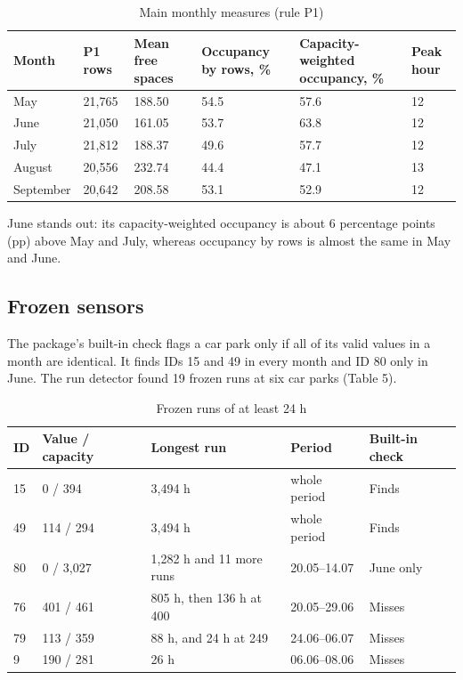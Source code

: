 \documentclass[default]{subfiles}
\begin{document}
{\begin{table}[htbp]
  \caption{Main monthly measures (rule P1)}
  \label{tab:4}
  \centering\small
  \begin{tabular}{p{}p{}p{}p{}p{}p{}}
    \hline
    \textbf{Month} & \textbf{P1 rows} & \textbf{Mean free spaces} & \textbf{Occupancy by rows, \%} & \textbf{Capacity-weighted occupancy, \%} & \textbf{Peak hour} \\ \hline
    May & 21,765 & 188.50 & 54.5 & 57.6 & 12 \\
    June & 21,050 & 161.05 & 53.7 & 63.8 & 12 \\
    July & 21,812 & 188.37 & 49.6 & 57.7 & 12 \\
    August & 20,556 & 232.74 & 44.4 & 47.1 & 13 \\
    September & 20,642 & 208.58 & 53.1 & 52.9 & 12 \\
    \hline
  \end{tabular}
\end{table}

June stands out: its capacity-weighted occupancy is about 6 percentage points (pp) above May and July, whereas occupancy by rows is almost the same in May and June.

\subsection{Frozen sensors}

The package's built-in check flags a car park only if all of its valid values in a month are identical. It finds IDs 15 and 49 in every month and ID 80 only in June. The run detector found 19 frozen runs at six car parks (Table 5).

\begin{table}[htbp]
  \caption{Frozen runs of at least 24 h}
  \label{tab:5}
  \centering\small
  \begin{tabular}{p{}p{}p{}p{}p{}}
    \hline
    \textbf{ID} & \textbf{Value / capacity} & \textbf{Longest run} & \textbf{Period} & \textbf{Built-in check} \\ \hline
    15 & 0 / 394 & 3,494 h & whole period & Finds \\
    49 & 114 / 294 & 3,494 h & whole period & Finds \\
    80 & 0 / 3,027 & 1,282 h and 11 more runs & 20.05--14.07 & June only \\
    76 & 401 / 461 & 805 h, then 136 h at 400 & 20.05--29.06 & Misses \\
    79 & 113 / 359 & 88 h, and 24 h at 249 & 24.06--06.07 & Misses \\
    9 & 190 / 281 & 26 h & 06.06--08.06 & Misses \\
    \hline
  \end{tabular}
\end{table}

}
\end{document}
